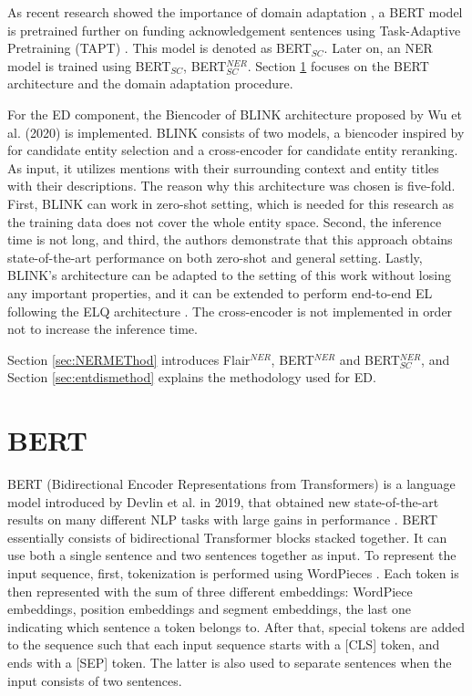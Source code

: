 \documentclass{report}
\theoremstyle{definition}
\theoremstyle{remark}
\begin{document}
As recent research showed the importance of domain adaptation \textcolor{red}{\cite{}}, a BERT model is pretrained further on funding acknowledgement sentences using Task-Adaptive Pretraining (TAPT) \cite{DontStop}. This model is denoted as BERT$_{SC}$. Later on, an NER model is trained using BERT$_{SC}$, BERT$_{SC}^{NER}$. Section \ref{sec:BERT} focuses on the BERT architecture and the domain adaptation procedure.

For the ED component, the Biencoder of BLINK architecture proposed by Wu et al. (2020) \cite{scalablezeroshot} is implemented. BLINK consists of two models, a biencoder inspired by \cite{polyencoder} for candidate entity selection and a cross-encoder \cite{polyencoder} for candidate entity reranking. As input, it utilizes mentions with their surrounding context and entity titles with their descriptions. The reason why this architecture was chosen is five-fold. First, BLINK can work in zero-shot setting, which is needed for this research as the training data does not cover the whole entity space. Second, the inference time is not long, and third, the authors demonstrate that this approach obtains state-of-the-art performance on both zero-shot and general setting. Lastly, BLINK's architecture can be adapted to the setting of this work without losing any important properties, and it can be extended to perform end-to-end EL following the ELQ architecture \cite{elq}. The cross-encoder is not implemented in order not to increase the inference time. 

Section \ref{sec:NERMEThod} introduces Flair$^{NER}$, BERT$^{NER}$ and BERT$_{SC}^{NER}$, and Section \ref{sec:entdismethod} explains the methodology used for ED.

\section{BERT}
\label{sec:BERT}

BERT (Bidirectional Encoder Representations from
Transformers) is a language model introduced by Devlin et al. in 2019, that obtained new state-of-the-art results on many different NLP tasks with large gains in performance \cite{BERT}. BERT essentially consists of bidirectional Transformer \cite{transformer} blocks stacked together. It can use both a single sentence and two sentences together as input. To represent the input sequence, first, tokenization is performed using WordPieces \cite{wordpiece}. Each token is then represented with the sum of three different embeddings: WordPiece embeddings, position embeddings and segment embeddings, the last one indicating which sentence a token belongs to. After that, special tokens are added to the sequence such that each input sequence starts with a [CLS] token, and ends with a [SEP] token. The latter is also used to separate sentences when the input consists of two sentences. 
\end{document}
